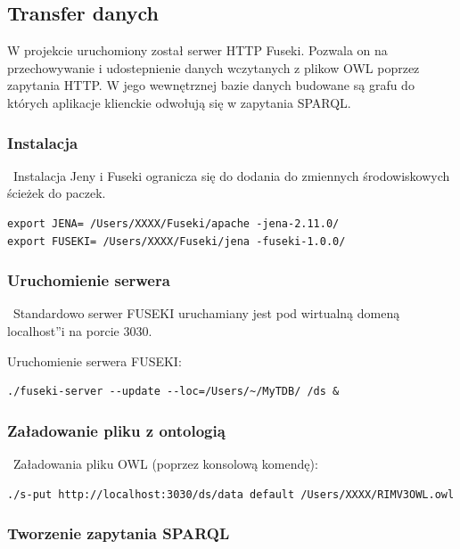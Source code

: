 \begin{multicols}{2}

\subsection{Transfer danych}
\label{sec:transfer}

W projekcie uruchomiony został serwer HTTP Fuseki. Pozwala on na przechowywanie i udostepnienie danych wczytanych z plikow OWL poprzez zapytania HTTP. W jego wewnętrznej bazie danych budowane są grafu do których aplikacje klienckie odwołują się w zapytania SPARQL.

\subsubsection{Instalacja}

~Instalacja Jeny i Fuseki ogranicza się do dodania do zmiennych środowiskowych ścieżek do paczek.
\begin{lstlisting}
export JENA= /Users/XXXX/Fuseki/apache -jena-2.11.0/
export FUSEKI= /Users/XXXX/Fuseki/jena -fuseki-1.0.0/
\end{lstlisting}

\subsubsection{Uruchomienie serwera}

~Standardowo serwer FUSEKI uruchamiany jest pod wirtualną domeną \quotedblbase localhost\textquotedblright i na porcie 3030.

Uruchomienie serwera FUSEKI:
\begin{lstlisting}
./fuseki-server --update --loc=/Users/~/MyTDB/ /ds &
\end{lstlisting}

\subsubsection{Załadowanie pliku z ontologią}

~Załadowania pliku OWL (poprzez konsolową komendę):

\begin{lstlisting}
./s-put http://localhost:3030/ds/data default /Users/XXXX/RIMV3OWL.owl
\end{lstlisting}

\subsubsection{Tworzenie zapytania SPARQL}


\end{multicols}
